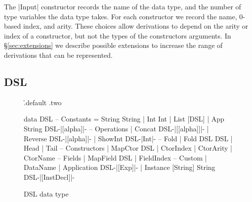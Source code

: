 \documentclass[preprint,draft]{sigplanconf}
\begin{document}
The |Input| constructor records the name of the data type, and the number of type variables the data type takes. For each constructor we record the name, 0-based index, and arity. These choices allow derivations to depend on the arity or index of a constructor, but not the types of the constructors arguments. In \S\ref{sec:extensions} we describe possible extensions to increase the range of derivations that can be represented.

\subsection{DSL}

\begin{figure}
\h{.default .two}\begin{code}
data DSL
       -- Constants
    =  String String
    |  Int Int
    |  List [DSL]
    |  App String DSL{-|[alpha]|-}
       -- Operations
    |  Concat DSL{-|[[alpha]]|-}
    |  Reverse DSL{-|[alpha]|-}
    |  ShowInt DSL{-|Int|-}
       -- Fold
    |  Fold DSL DSL
    |  Head
    |  Tail
       -- Constructors
    |  MapCtor DSL
    |  CtorIndex
    |  CtorArity
    |  CtorName
       -- Fields
    |  MapField DSL
    |  FieldIndex
       -- Custom
    |  DataName
    |  Application DSL{-|[Exp]|-}
    |  Instance [String] String DSL{-|[InstDecl]|-}
\end{code}
\caption{DSL data type}
\label{fig:dsl}
\end{figure}
\end{document}
